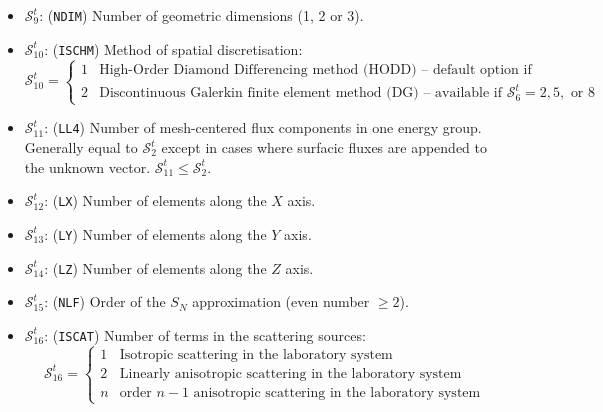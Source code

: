\begin{itemize}
\item $\mathcal{S}^{t}_{9}$: ({\tt NDIM}) Number of geometric dimensions (1, 2 or 3).

\item $\mathcal{S}^{t}_{10}$: ({\tt ISCHM}) Method of spatial discretisation:
\begin{displaymath}
\mathcal{S}^{t}_{10} = \left\{
\begin{array}{rl}
 1 & \textrm{High-Order Diamond Differencing method (HODD) -- default option if unspecified} \\
 2 & \textrm{Discontinuous Galerkin finite element method (DG) -- available if $\mathcal{S}^{t}_{6} = 2, 5,$ or $8$}
\end{array} \right.
\end{displaymath}

\item $\mathcal{S}^{t}_{11}$: ({\tt LL4}) Number of mesh-centered flux components in one energy group.
Generally equal to
$\mathcal{S}^{t}_{2}$ except in cases where surfacic fluxes are appended to the
unknown vector. $\mathcal{S}^{t}_{11}\le\mathcal{S}^{t}_{2}$.

\item $\mathcal{S}^{t}_{12}$: ({\tt LX}) Number of elements along the $X$ axis.

\item $\mathcal{S}^{t}_{13}$: ({\tt LY}) Number of elements along the $Y$ axis.

\item $\mathcal{S}^{t}_{14}$: ({\tt LZ}) Number of elements along the $Z$ axis.

\item $\mathcal{S}^{t}_{15}$: ({\tt NLF}) Order of the $S_N$ approximation (even number $\ge 2$).

\item $\mathcal{S}^{t}_{16}$: ({\tt ISCAT}) Number of terms in the scattering sources:
\begin{displaymath}
\mathcal{S}^{t}_{16} = \left\{
\begin{array}{rl}
 1 & \textrm{Isotropic scattering in the laboratory system} \\
 2 & \textrm{Linearly anisotropic scattering in the laboratory system} \\
 n & \textrm{order $n-1$ anisotropic scattering in the laboratory system}
\end{array} \right.
\end{displaymath}


\end{itemize}
